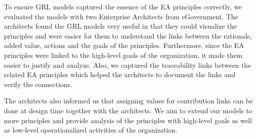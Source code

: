
To ensure GRL models captured the essence of the EA principles correctly, we evaluated the models with two Enterprise Architects from eGovernment. The
architects found the GRL models very useful in that they could visualize the principles and were easier for them to understand the links between the rationale, added value, actions and the goals of the principles. Furthermore, since the EA
principles were linked to the high-level goals of the organization, it made them easier to justify and analyze. Also, we captured the traceability links between the related EA principles which helped the architects to document the links and
verify the connections.

The architects also informed us that assigning values for contribution links can be done at design time together with the architects.
We aim to extend our models to more principles and provide analysis of the principles with high-level goals as well as low-level operationalized activities of the organization.
